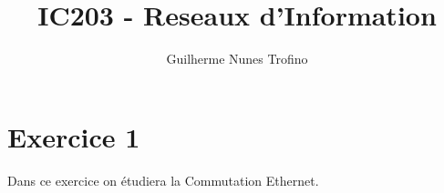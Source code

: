 \documentclass{article}
\title{IC203 - Reseaux d'Information}
\author{Guilherme Nunes Trofino}
\begin{document}
\maketitle

\newcommand{\tablesCommutation}[3]{
    \begin{center}
        \begin{minipage}[t]{0.3\textwidth}
            \begin{table}[H]
                \centering\begin{tabular}{r|l}
                    \multicolumn{2}{l}{S1}\\
                    port & MAC\\
                    \hline
                        #1
                    \hline
                \end{tabular}
            \end{table}
        \end{minipage}
        \begin{minipage}[t]{0.3\textwidth}
            \begin{table}[H]
                \centering\begin{tabular}{r|l}
                    \multicolumn{2}{l}{S2}\\
                    port & MAC\\
                    \hline
                        #2
                    \hline
                \end{tabular}
            \end{table}
        \end{minipage}
        \begin{minipage}[t]{0.3\textwidth}
            \begin{table}[H]
                \centering\begin{tabular}{r|l}
                    \multicolumn{2}{l}{S3}\\
                    port & MAC\\
                    \hline
                        #3
                    \hline
                \end{tabular}
            \end{table}
        \end{minipage}
    \end{center}
}


\section*{Exercice 1}
\noindent Dans ce exercice on étudiera la Commutation Ethernet.
\end{document}
